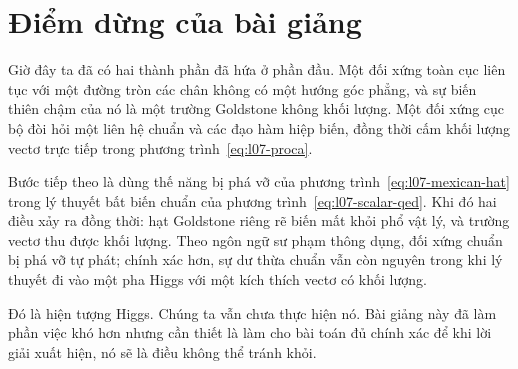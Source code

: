 \begin{classroomqa}
\end{classroomqa}

\section{Điểm dừng của bài giảng}

Giờ đây ta đã có hai thành phần đã hứa ở phần đầu. Một đối xứng toàn cục liên tục với một đường tròn các chân không có một hướng góc phẳng, và sự biến thiên chậm của nó là một trường Goldstone không khối lượng. Một đối xứng cục bộ đòi hỏi một liên hệ chuẩn và các đạo hàm hiệp biến, đồng thời cấm khối lượng vectơ trực tiếp trong phương trình~\eqref{eq:l07-proca}.

Bước tiếp theo là dùng thế năng bị phá vỡ của phương trình~\eqref{eq:l07-mexican-hat} trong lý thuyết bất biến chuẩn của phương trình~\eqref{eq:l07-scalar-qed}. Khi đó hai điều xảy ra đồng thời: hạt Goldstone riêng rẽ biến mất khỏi phổ vật lý, và trường vectơ thu được khối lượng. Theo ngôn ngữ sư phạm thông dụng, đối xứng chuẩn bị phá vỡ tự phát; chính xác hơn, sự dư thừa chuẩn vẫn còn nguyên trong khi lý thuyết đi vào một pha Higgs với một kích thích vectơ có khối lượng.

Đó là hiện tượng Higgs. Chúng ta vẫn chưa thực hiện nó. Bài giảng này đã làm phần việc khó hơn nhưng cần thiết là làm cho bài toán đủ chính xác để khi lời giải xuất hiện, nó sẽ là điều không thể tránh khỏi.